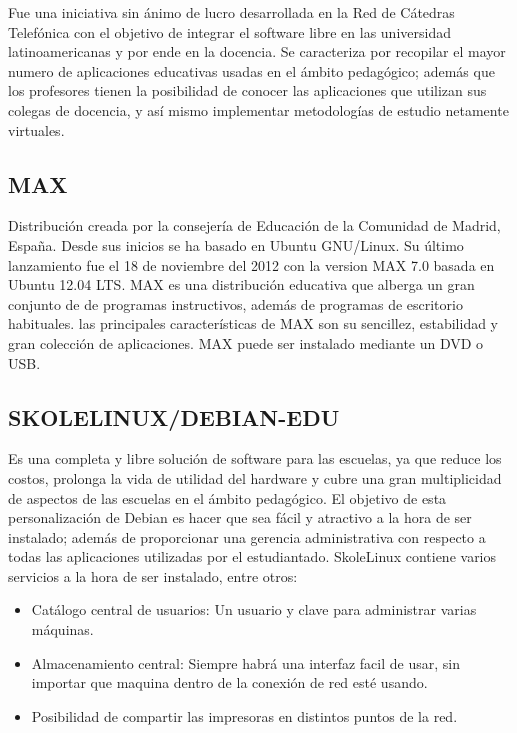Fue una iniciativa sin ánimo de lucro desarrollada en la Red de
Cátedras Telefónica con el objetivo de integrar el software libre
en las universidad latinoamericanas y por ende en la docencia.
Se caracteriza por recopilar el mayor numero de aplicaciones
educativas usadas en el ámbito pedagógico; además que los
profesores tienen la posibilidad de conocer las aplicaciones que 
utilizan sus colegas de docencia, y así mismo implementar
metodologías de estudio netamente virtuales.

\subsection*{MAX}

Distribución creada por la consejería de Educación de la
Comunidad de Madrid, España. Desde sus inicios se ha basado
en Ubuntu GNU/Linux. Su último lanzamiento fue el 18 de
noviembre del 2012 con la version MAX 7.0 basada en Ubuntu
12.04 LTS.
MAX es una distribución educativa que alberga un gran conjunto
de de programas instructivos, además de programas de
escritorio habituales.
las principales características de MAX son su sencillez,
estabilidad y gran colección de aplicaciones.
MAX puede ser instalado mediante un DVD o USB.

\subsection*{SKOLELINUX/DEBIAN-EDU}
Es una completa y libre solución de
software para las escuelas, ya que reduce los costos, prolonga la
vida de utilidad del hardware y cubre una gran multiplicidad de
aspectos de las escuelas en el ámbito pedagógico.
El objetivo de esta personalización de Debian es hacer que sea
fácil y atractivo a la hora de ser instalado; además de
proporcionar una gerencia administrativa con respecto a todas
las aplicaciones utilizadas por el estudiantado.
SkoleLinux contiene varios servicios a la hora de ser instalado,
entre otros:
\begin{itemize}
  \item Catálogo central de usuarios: Un usuario y clave para
        administrar varias máquinas.
  \item Almacenamiento central: Siempre habrá una interfaz facil de usar, sin importar que maquina dentro de la conexión de red esté usando.
  \item Posibilidad de compartir las impresoras en distintos puntos de la red.
\end{itemize}

